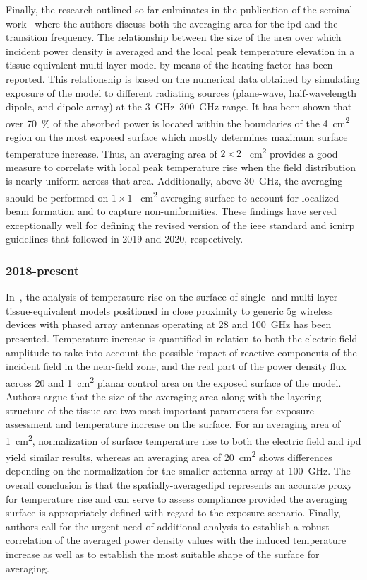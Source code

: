 Finally, the research outlined so far culminates in the publication of the seminal work~\cite{Hashimoto2017On} where the authors discuss both the averaging area for the \gls{ipd} and the transition frequency.
The relationship between the size of the area over which incident power density is averaged and the local peak temperature elevation in a tissue-equivalent multi-layer model by means of the heating factor has been reported.
This relationship is based on the numerical data obtained by simulating exposure of the model to different radiating sources (plane-wave, half-wavelength dipole, and dipole array) at the \SIrange[range-units=single,range-phrase=--]{3}{300}{\GHz} range.
It has been shown that over \SI{70}{\percent} of the absorbed power is located within the boundaries of the \SI{4}{\cm\squared} region on the most exposed surface which mostly determines maximum surface temperature increase.
Thus, an averaging area of $2 \times 2$ \SI{}{\cm\squared} provides a good measure to correlate with local peak temperature rise when the field distribution is nearly uniform across that area.
Additionally, above \SI{30}{\GHz}, the averaging should be performed on $1 \times 1$ \SI{}{\cm\squared} averaging surface to account for localized beam formation and to capture non-uniformities.
These findings have served exceptionally well for defining the revised version of the \gls{ieee} standard and \gls{icnirp} guidelines that followed in 2019 and 2020, respectively.

\subsubsection*{2018-present}
In~\cite{Christ2018Thermal}, the analysis of temperature rise on the surface of single- and multi-layer- tissue-equivalent models positioned in close proximity to generic \gls{5g} wireless devices with phased array antennas operating at \SI{28}{} and \SI{100}{\GHz} has been presented.
Temperature increase is quantified in relation to both the electric field amplitude to take into account the possible impact of reactive components of the incident field in the near-field zone, and the real part of the power density flux across \SI{20}{} and \SI{1}{\cm\squared} planar control area on the exposed surface of the model.
Authors argue that the size of the averaging area along with the layering structure of the tissue are two most important parameters for exposure assessment and temperature increase on the surface.
For an averaging area of \SI{1}{\cm\squared}, normalization of surface temperature rise to both the electric field and \gls{ipd} yield similar results, whereas an averaging area of \SI{20}{\cm\squared} shows differences depending on the normalization for the smaller antenna array at \SI{100}{\GHz}.
The overall conclusion is that the spatially-averaged\gls{ipd} represents an accurate proxy for temperature rise and can serve to assess compliance provided the averaging surface is appropriately defined with regard to the exposure scenario.
Finally, authors call for the urgent need of additional analysis to establish a robust correlation of the averaged power density values with the induced temperature increase as well as to establish the most suitable shape of the surface for averaging.

